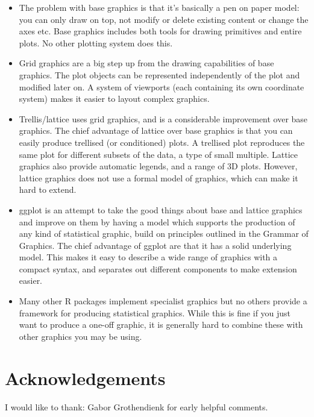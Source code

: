\begin{itemize} 
	\item The problem with base graphics is that it's basically a pen on paper model: you can only draw on top, not modify or delete existing content or change the axes etc.  Base graphics includes both tools for drawing primitives and entire plots. No other plotting system does this.

	\item Grid graphics are a big step up from the drawing capabilities of base graphics. The plot objects can be represented independently of the plot and modified later on. A system of viewports (each containing its own coordinate system) makes it easier to layout complex graphics.

	\item Trellis/lattice uses grid graphics, and is a considerable improvement over base graphics.  The chief advantage of lattice over base graphics is that you can easily produce trellised (or conditioned) plots.  A trellised plot reproduces the same plot for different subsets of the data, a type of small multiple.  Lattice graphics also provide automatic legends, and a range of 3D plots.  However, lattice graphics does not use a formal model of graphics, which can make it hard to extend.

	\item ggplot is an attempt to take the good things about base and lattice graphics and improve on them by having a model which supports the production of any kind of statistical graphic, build on principles outlined in the Grammar of Graphics.  The chief advantage of ggplot are that it has a solid underlying model.  This makes it easy to describe a wide range of graphics with a compact syntax, and separates out different components to make extension easier.

	\item Many other R packages implement specialist graphics but no others provide a framework for producing statistical graphics. While this is fine if you just want to produce a one-off graphic, it is generally hard to combine these with other graphics you may be using.

\end{itemize}

\section{Acknowledgements}\label{sec:acknolwedgements}

I would like to thank: Gabor Grothendienk for early helpful comments.


